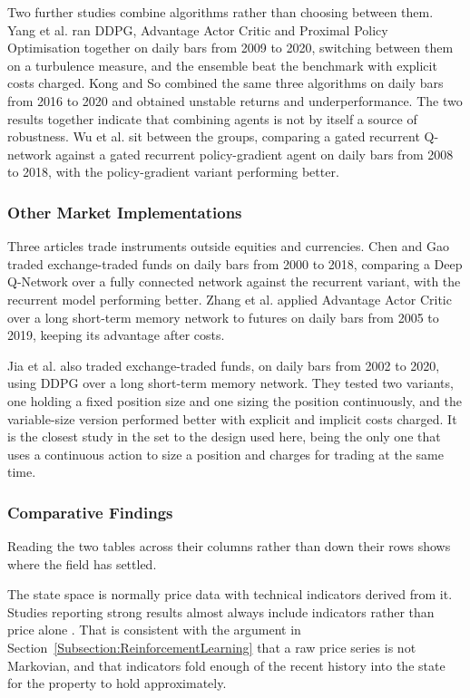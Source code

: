 Two further studies combine algorithms rather than choosing between them. Yang et al. \cite{yang_deep_2020} ran DDPG, Advantage Actor Critic and Proximal Policy Optimisation together on daily bars from 2009 to 2020, switching between them on a turbulence measure, and the ensemble beat the benchmark with explicit costs charged. Kong and So \cite{kong_empirical_2023} combined the same three algorithms on daily bars from 2016 to 2020 and obtained unstable returns and underperformance. The two results together indicate that combining agents is not by itself a source of robustness. Wu et al. \cite{wu_adaptive_2020} sit between the groups, comparing a gated recurrent Q-network against a gated recurrent policy-gradient agent on daily bars from 2008 to 2018, with the policy-gradient variant performing better.

\subsubsection{Other Market Implementations}

Three articles trade instruments outside equities and currencies. Chen and Gao \cite{chen_application_2019} traded exchange-traded funds on daily bars from 2000 to 2018, comparing a Deep Q-Network over a fully connected network against the recurrent variant, with the recurrent model performing better. Zhang et al. \cite{zhang_deep_2020} applied Advantage Actor Critic over a long short-term memory network to futures on daily bars from 2005 to 2019, keeping its advantage after costs.

Jia et al. \cite{jia_lstm-ddpg_2021} also traded exchange-traded funds, on daily bars from 2002 to 2020, using DDPG over a long short-term memory network. They tested two variants, one holding a fixed position size and one sizing the position continuously, and the variable-size version performed better with explicit and implicit costs charged. It is the closest study in the set to the design used here, being the only one that uses a continuous action to size a position and charges for trading at the same time.

\subsubsection{Comparative Findings}

Reading the two tables across their columns rather than down their rows shows where the field has settled.

The state space is normally price data with technical indicators derived from it. Studies reporting strong results almost always include indicators rather than price alone \cite{carapuco_reinforcement_2018, huang_financial_2018, yang_deep_2020}. That is consistent with the argument in Section~\ref{Subsection:ReinforcementLearning} that a raw price series is not Markovian, and that indicators fold enough of the recent history into the state for the property to hold approximately.

